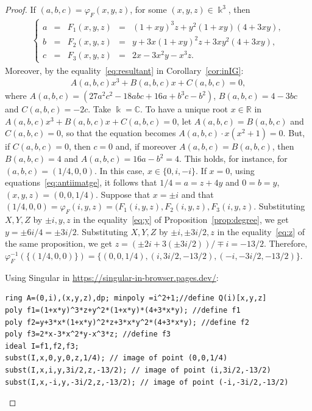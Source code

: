 \documentclass[11pt,reqno]{amsart}
\theoremstyle{definition}
\newcommand{\mbk}{\mbox{$\Bbbk$}}
\newcommand{\mbc}{\mbox{$\mathbb{C}$}}
\newcommand{\mbr}{\mbox{$\mathbb{R}$}}
\begin{document}
\begin{proof}
If $(a,b,c)=\varphi_F(x,y,z)$, for some $(x,y,z)\in\mbk^3$, then
\begin{eqnarray}\label{eq:antiimatge}
\left\{\begin{array}{ccccl}
a&=&F_1(x,y,z)&=&(1+xy)^3z+y^2(1+xy)(4+3xy),\\
b&=&F_2(x,y,z)&=&y+3x(1+xy)^2z+3xy^2(4+3xy),\\ 
c&=&F_3(x,y,z)&=&2x-3x^2y-x^3z.\end{array}\right.
\end{eqnarray} 
Moreover, by the equality~\eqref{eq:resultant} in Corollary~\ref{cor:inIG}:
\begin{eqnarray*}
A(a,b,c)x^3+B(a,b,c)x+C(a,b,c)=0,
\end{eqnarray*}
where $A(a,b,c)=(27a^2c^2-18abc+16a+b^3c-b^2)$, $B(a,b,c)=4-3bc$ and $C(a,b,c)=-2c$.
Take $\mbk=\mbc$. To have a unique root $x\in\mbr$ in $A(a,b,c)x^3+B(a,b,c)x+C(a,b,c)=0$, let
$A(a,b,c)=B(a,b,c)$ and $C(a,b,c)=0$, so that the equation becomes $A(a,b,c)\cdot x(x^2+1)=0$. 
But, if $C(a,b,c)=0$, then $c=0$ and, if moreover $A(a,b,c)=B(a,b,c)$, then 
$B(a,b,c)=4$ and $A(a,b,c)=16a-b^2=4$. This holds, for instance, for $(a,b,c)=(1/4,0,0)$. In this case, $x\in\{0,i,-i\}$. If $x=0$, using equations~\eqref{eq:antiimatge}, it follows that $1/4=a=z+4y$ and $0=b=y$, $(x,y,z)=(0,0,1/4)$. Suppose that $x=\pm i$ and that $(1/4,0,0)=\varphi_F(i,y,z)=(F_1(i,y,z),F_2(i,y,z),F_3(i,y,z)$. 
Substituting $X,Y,Z$ by $\pm i,y,z$ in the equality~\eqref{eq:y} of Proposition~\ref{prop:degree}, we get $y=\pm 6i/4=\pm 3i/2$. Substituting $X,Y,Z$ by $\pm i,\pm 3i/2,z$ in the equality~\eqref{eq:z} of the same proposition, we get $z=(\pm 2i+3(\pm 3i/2))/\mp i=- 13/2$. Therefore, $\varphi_F^{-1}(\{(1/4,0,0)\})=\{(0,0,1/4),(i,3i/2,-13/2),(-i,-3i/2,-13/2)\}$.

Using {\sc Singular} \cite{dgps} in \url{https://singular-in-browser.pages.dev/}:
\begin{verbatim}
ring A=(0,i),(x,y,z),dp; minpoly =i^2+1;//define Q(i)[x,y,z]
poly f1=(1+x*y)^3*z+y^2*(1+x*y)*(4+3*x*y); //define f1
poly f2=y+3*x*(1+x*y)^2*z+3*x*y^2*(4+3*x*y); //define f2
poly f3=2*x-3*x^2*y-x^3*z; //define f3
ideal I=f1,f2,f3;
subst(I,x,0,y,0,z,1/4); // image of point (0,0,1/4)
subst(I,x,i,y,3i/2,z,-13/2); // image of point (i,3i/2,-13/2)
subst(I,x,-i,y,-3i/2,z,-13/2); // image of point (-i,-3i/2,-13/2)
\end{verbatim}
\end{proof}
\end{document}
